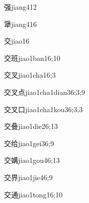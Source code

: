\begin{verbete}{强}{jiang4}{12}
\end{verbete}

\begin{verbete}{犟}{jiang4}{16}
\end{verbete}

\begin{verbete}{交}{jiao1}{6}
\end{verbete}

\begin{verbete}{交班}{jiao1ban1}{6;10}
\end{verbete}

\begin{verbete}{交叉}{jiao1cha1}{6;3}
\end{verbete}

\begin{verbete}{交叉点}{jiao1cha1dian3}{6;3;9}
\end{verbete}

\begin{verbete}{交叉口}{jiao1cha1kou3}{6;3;3}
\end{verbete}

\begin{verbete}{交叠}{jiao1die2}{6;13}
\end{verbete}

\begin{verbete}{交给}{jiao1gei3}{6;9}
\end{verbete}

\begin{verbete}{交媾}{jiao1gou4}{6;13}
\end{verbete}

\begin{verbete}{交界}{jiao1jie4}{6;9}
\end{verbete}

\begin{verbete}{交通}{jiao1tong1}{6;10}
\end{verbete}

